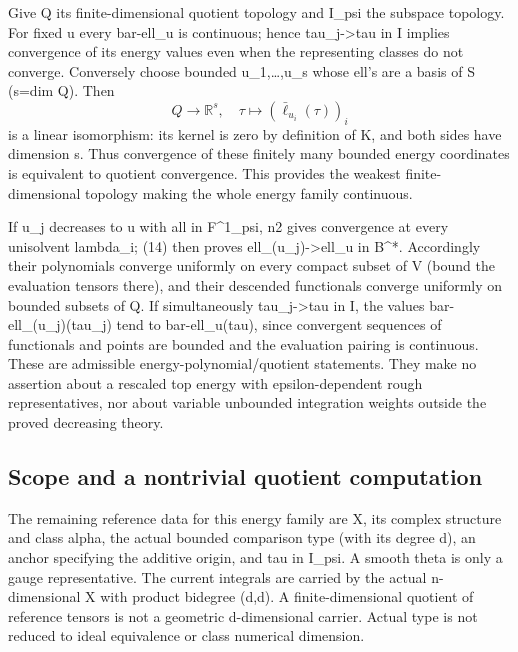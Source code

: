 \documentclass[
]{article}
\begin{document}
Give Q its finite-dimensional quotient topology and I\_psi the subspace
topology. For fixed u every bar-ell\_u is continuous; hence
tau\_j-\textgreater tau in I implies convergence of its energy values
even when the representing classes do not converge. Conversely choose
bounded u\_1,\ldots,u\_s whose ell's are a basis of S (s=dim Q). Then \[
Q\longrightarrow\mathbb R^s,\quad
\tau\longmapsto(\bar\ell_{u_i}(\tau))_i
\] is a linear isomorphism: its kernel is zero by definition of K, and
both sides have dimension s. Thus convergence of these finitely many
bounded energy coordinates is equivalent to quotient convergence. This
provides the weakest finite-dimensional topology making the whole energy
family continuous.

If u\_j decreases to u with all in F\^{}1\_psi, n2 gives convergence at
every unisolvent lambda\_i; (14) then proves
ell\_(u\_j)-\textgreater ell\_u in B\^{}*. Accordingly their polynomials
converge uniformly on every compact subset of V (bound the evaluation
tensors there), and their descended functionals converge uniformly on
bounded subsets of Q. If simultaneously tau\_j-\textgreater tau in I,
the values bar-ell\_(u\_j)(tau\_j) tend to bar-ell\_u(tau), since
convergent sequences of functionals and points are bounded and the
evaluation pairing is continuous. These are admissible
energy-polynomial/quotient statements. They make no assertion about a
rescaled top energy with epsilon-dependent rough representatives, nor
about variable unbounded integration weights outside the proved
decreasing theory.

\subsection{Scope and a nontrivial quotient
computation}\label{scope-and-a-nontrivial-quotient-computation}

The remaining reference data for this energy family are X, its complex
structure and class alpha, the actual bounded comparison type (with its
degree d), an anchor specifying the additive origin, and tau in I\_psi.
A smooth theta is only a gauge representative. The current integrals are
carried by the actual n-dimensional X with product bidegree (d,d). A
finite-dimensional quotient of reference tensors is not a geometric
d-dimensional carrier. Actual type is not reduced to ideal equivalence
or class numerical dimension.
\end{document}
